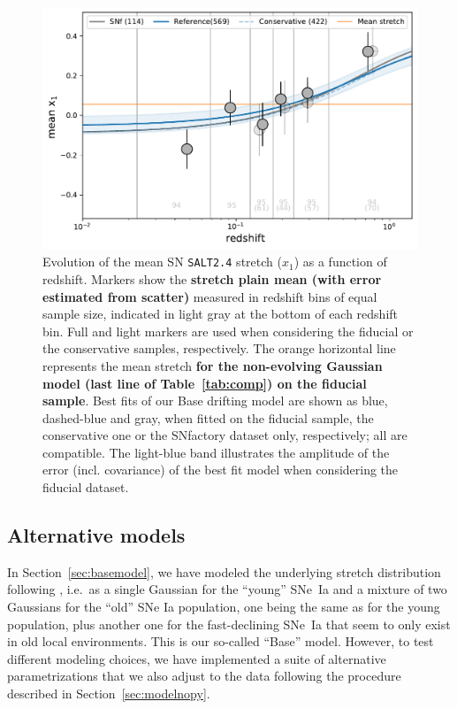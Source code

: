 \documentclass[referee]{aa}
\begin{document}
\begin{figure}
    \centering
    \includegraphics[width=0.7\linewidth]{Article_figures/stretchevol_all_vs_snf-mean.pdf}
    \caption{Evolution of the mean SN \textsc{\texttt{SALT2.4}} stretch ($x_1$)
        as a function of redshift. Markers show the \textbf{stretch plain mean
        (with error estimated from scatter)} measured in redshift bins of equal
        sample size, indicated in light gray at the bottom of each redshift bin.
        Full and light markers are used when considering the fiducial or the
        conservative samples, respectively. The orange horizontal line
        represents the mean stretch \textbf{for the non-evolving Gaussian model
        (last line of Table~\ref{tab:comp}) on the fiducial sample}. Best
        fits of our Base drifting model are shown as blue, dashed-blue and
        gray, when fitted on the fiducial sample, the conservative one or
        the SNfactory dataset only, respectively; all are compatible. The
        light-blue band illustrates the amplitude of the error (incl.
        covariance) of the best fit model when considering the fiducial
    dataset.}
    \label{fig:modelall}
\end{figure}

\subsection{Alternative models}\label{sec:othermodel}

In Section~\ref{sec:basemodel}, we have modeled the underlying stretch
distribution following \cite{rigault2020}, i.e.\ as a single Gaussian for the
``young'' SNe~Ia and a mixture of two Gaussians for the ``old'' SNe Ia
population, one being the same as for the young population, plus another one for
the fast-declining SNe~Ia that seem to only exist in old local environments.
This is our so-called ``Base'' model. However, to test different modeling
choices, we have implemented a suite of alternative parametrizations that we
also adjust to the data following the procedure described in
Section~\ref{sec:modelnopy}. 
\end{document}
